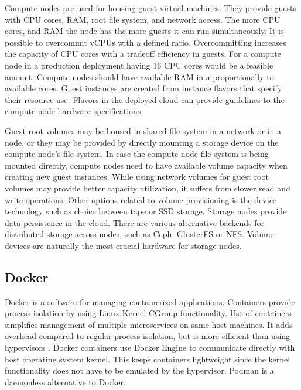 Compute nodes are used for housing guest virtual machines. They provide guests
with CPU cores, RAM, root file system, and network access. The more CPU cores,
and RAM the node has the more guests it can run simultaneously. It is possible
to overcommit vCPUs with a defined ratio. Overcommitting increases the capacity
of CPU cores with a tradeoff efficiency in guests. For a compute node in a
production deployment having 16 CPU cores would be a feasible amount. Compute
nodes should have available RAM in a proportionally to available cores. Guest
instances are created from instance flavors that specify their resource use.
Flavors in the deployed cloud can provide guidelines to the compute node
hardware specifications.

Guest root volumes may be housed in shared file system in a network or in a
node, or they may be provided by directly mounting a storage device on the
compute node's file system. In case the compute node file system is being
mounted directly, compute nodes need to have available volume capacity when
creating new guest instances. While using network volumes for guest root
volumes may provide better capacity utilization, it suffers from slower read
and write operations. Other options related to volume provisioning is the
device technology such as choice between tape or SSD storage. Storage nodes
provide data persistence in the cloud. There are various alternative backends
for distributed storage across nodes, such as Ceph, GlusterFS or NFS. Volume
devices are naturally the most crucial hardware for storage nodes.

\subsection{Docker}

Docker \cite{bernstein2014containers} is a software for managing containerized
applications. Containers provide process isolation by using Linux Kernel
CGroup \cite{cgroup} functionality. Use of containers simplifies management of
multiple microservices on same host machines. It adds overhead compared to
regular process isolation, but is more efficient than using hypervisors
\cite{soltesz2007container-based}. Docker containers use Docker Engine to
communicate directly with host operating system kernel. This keeps containers
lightweight since the kernel functionality does not have to be emulated by the
hypervisor. Podman \cite{podman} is a daemonless alternative to Docker.

